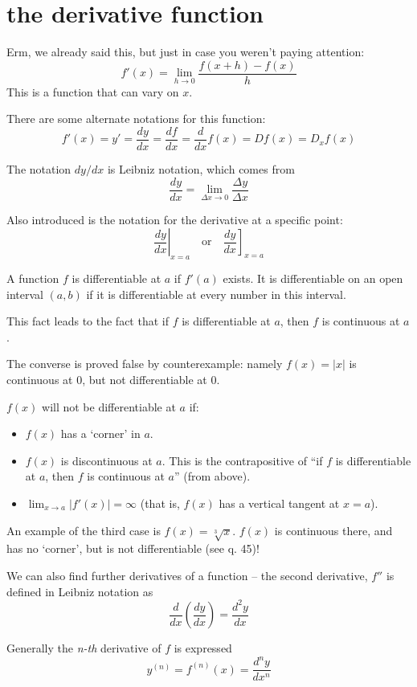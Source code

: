\documentclass[10pt,a4paper]{report}
\begin{document}
\section{the derivative function}

Erm, we already said this, but just in case you weren't paying attention:
$$
	f'(x) = \lim_{h \to 0} \frac{f(x + h) - f(x)}{h}
$$
This is a function that can vary on $x$.

There are some alternate notations for this function:
$$
	f'(x) = y' = \frac{dy}{dx} = \frac{df}{dx} = \frac{d}{dx}f(x) = Df(x) = D_x f(x)
$$

The notation $dy/dx$ is Leibniz notation, which comes from
$$
	\frac{dy}{dx} = \lim_{\Delta x \to 0} \frac{\Delta y}{\Delta x}
$$

Also introduced is the notation for the derivative at a specific point:
$$
	\left. \frac{dy}{dx} \right|_{x=a}
	\quad \text{or} \quad
	\left. \frac{dy}{dx} \right]_{x=a}
$$

A function $f$ is differentiable at $a$ if $f'(a)$ exists. It is differentiable on an open interval $(a, b)$ if it is differentiable at every number in this interval.

This fact leads to the fact that if $f$ is differentiable at $a$, then $f$ is continuous at $a$.

The converse is proved false by counterexample: namely $f(x) = |x|$ is continuous at 0, but not differentiable at 0.

$f(x)$ will not be differentiable at $a$ if:
\begin{itemize}
	\item $f(x)$ has a `corner' in $a$.
	\item $f(x)$ is discontinuous at $a$. This is the contrapositive of ``if $f$ is differentiable at $a$, then $f$ is continuous at $a$'' (from above).
	\item $\lim_{x \to a} | f'(x) | = \infty $ (that is, $f(x)$ has a vertical tangent at $x = a$).
\end{itemize}

An example of the third case is $f(x) = \sqrt[3]{x}$. $f(x)$ is continuous there, and has no `corner', but is not differentiable (see q. 45)!

We can also find further derivatives of a function -- the second derivative, $f''$ is defined in Leibniz notation as
$$
	\frac{d}{dx} (\frac{dy}{dx}) = \frac{d^2y}{dx}
$$

Generally the \emph{n-th} derivative of $f$ is expressed
$$
	y^{(n)} = f^{(n)} (x) = \frac{d^n y}{dx^n}
$$
\end{document}
